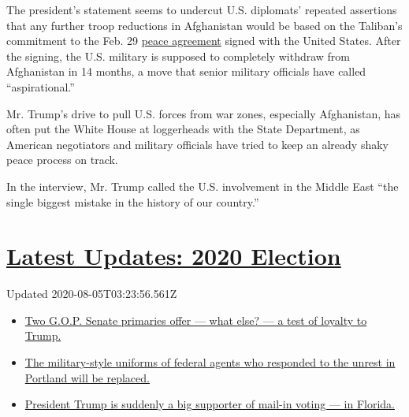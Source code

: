 The president's statement seems to undercut U.S. diplomats' repeated
assertions that any further troop reductions in Afghanistan would be
based on the Taliban's commitment to the Feb. 29
\href{https://www.nytimes.com/2020/02/29/world/asia/us-taliban-deal.html}{peace
agreement} signed with the United States. After the signing, the U.S.
military is supposed to completely withdraw from Afghanistan in 14
months, a move that senior military officials have called
``aspirational.''

Mr. Trump's drive to pull U.S. forces from war zones, especially
Afghanistan, has often put the White House at loggerheads with the State
Department, as American negotiators and military officials have tried to
keep an already shaky peace process on track.

In the interview, Mr. Trump called the U.S. involvement in the Middle
East ``the single biggest mistake in the history of our country.''

\hypertarget{latest-updates-2020-election}{%
\section{\texorpdfstring{\href{https://www.nytimes.com/2020/08/04/us/elections/primary-election-michigan-arizona-kansas.html?action=click\&pgtype=Article\&state=default\&region=MAIN_CONTENT_1\&context=storylines_live_updates}{Latest
Updates: 2020
Election}}{Latest Updates: 2020 Election}}\label{latest-updates-2020-election}}

Updated 2020-08-05T03:23:56.561Z

\begin{itemize}
\tightlist
\item
  \href{https://www.nytimes.com/2020/08/04/us/elections/primary-election-michigan-arizona-kansas.html?action=click\&pgtype=Article\&state=default\&region=MAIN_CONTENT_1\&context=storylines_live_updates\#link-3924dd44}{Two
  G.O.P. Senate primaries offer --- what else? --- a test of loyalty to
  Trump.}
\item
  \href{https://www.nytimes.com/2020/08/04/us/elections/primary-election-michigan-arizona-kansas.html?action=click\&pgtype=Article\&state=default\&region=MAIN_CONTENT_1\&context=storylines_live_updates\#link-62a8e06b}{The
  military-style uniforms of federal agents who responded to the unrest
  in Portland will be replaced.}
\item
  \href{https://www.nytimes.com/2020/08/04/us/elections/primary-election-michigan-arizona-kansas.html?action=click\&pgtype=Article\&state=default\&region=MAIN_CONTENT_1\&context=storylines_live_updates\#link-32b39e33}{President
  Trump is suddenly a big supporter of mail-in voting --- in Florida.}
\end{itemize}

